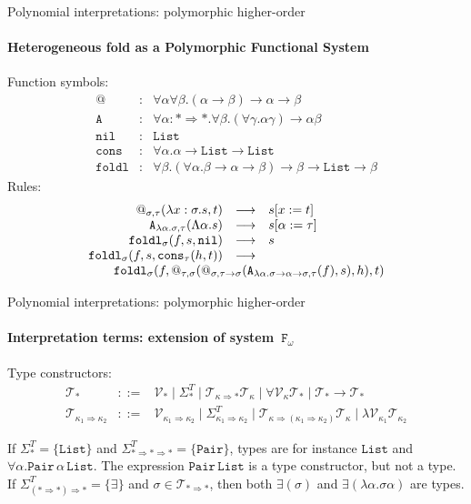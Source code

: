 \documentclass[10pt,presentation,color=names]{beamer}
\newcommand{\Fomega}{\mathtt{F}_\omega}
\newcommand{\arrkind}{\Rightarrow}
\newcommand{\arrtype}{\rightarrow}
\newcommand{\abs}[2]{\lambda #1.#2}
\newcommand{\tabs}[2]{\Lambda #1.#2}
\newcommand{\red}{\longrightarrow}
\newcommand{\Tc}{\mathcal{T}}
\newcommand{\Vc}{\mathcal{V}}
\newcommand{\List}{\mathtt{List}}
\newcommand{\Pair}{\mathtt{Pair}}
\newcommand{\nil}{\mathtt{nil}}
\newcommand{\cons}{\mathtt{cons}}
\begin{document}
\begin{frame}{Polynomial interpretations: polymorphic higher-order}
  \framesubtitle{Heterogeneous fold as a Polymorphic Functional System}
  Function symbols:
  \[
  \begin{array}{rcl}
    @ & : & \forall \alpha \forall \beta . (\alpha \arrtype \beta) \arrtype \alpha \arrtype \beta \\
    \mathtt{A} & : & \forall \alpha : * \arrkind * . \forall \beta .
    (\forall \gamma .\alpha \gamma) \arrtype \alpha \beta \\
    \mathtt{nil} & : & \List \\
    \mathtt{cons} & : & \forall \alpha . \alpha \arrtype \List \arrtype \List \\
    \mathtt{foldl} & : & \forall \beta . (\forall \alpha . \beta \arrtype \alpha \arrtype \beta) \arrtype \beta \arrtype \List \arrtype \beta
  \end{array}
  \]\pause
  Rules:
  \[
  \begin{array}{rcl}
    @_{\sigma,\tau}(\abs{x:\sigma}{s},t) & \red & s[x:=t] \\
    \mathtt{A}_{\abs{\alpha}{\sigma},\tau}(\tabs{\alpha}{s}) & \red & s[\alpha:=\tau] \\
    \mathtt{foldl}_\sigma(f,s,\nil) & \red & s \\
    \mathtt{foldl}_\sigma(f,s,\cons_\tau(h,t)) & \red & \\
    \multicolumn{3}{c}{\quad\quad\mathtt{foldl}_\sigma(f,@_{\tau,\sigma}(@_{\sigma,\tau\arrtype\sigma}(\mathtt{A}_{\abs{\alpha}{\sigma\arrtype\alpha\arrtype\sigma},\tau}(f),s),h),t)}
  \end{array}
  \]
\end{frame}

\begin{frame}{Polynomial interpretations: polymorphic higher-order}
  \framesubtitle{Interpretation terms: extension of system~$\Fomega$}
  Type constructors:
  \[
  \begin{array}{rcl}
    \Tc_{*} &::=& \Vc_{*} \mid \Sigma^T_{*} \mid \Tc_{\kappa\arrkind
      *}\Tc_{\kappa} \mid \forall\Vc_\kappa\Tc_* \mid
    \Tc_*\arrtype\Tc_* \\ \Tc_{\kappa_1\arrkind\kappa_2} &::=&
    \Vc_{\kappa_1\arrkind\kappa_2} \mid
    \Sigma^T_{\kappa_1\arrkind\kappa_2} \mid
    \Tc_{\kappa\arrkind(\kappa_1\arrkind\kappa_2)}\Tc_{\kappa} \mid
    \lambda \Vc_{\kappa_1} \Tc_{\kappa_2}
  \end{array}
  \]
  \pause
  \begin{example}
  If $\Sigma^T_{*} = \{ \List \}$ and $\Sigma^T_{* \arrkind * \arrkind
    *} = \{ \Pair \}$, types are for instance $\List$ and $\forall
  \alpha.\Pair\,\alpha\,\List$.  The expression $\Pair\,\List$ is a
  type constructor, but not a type.  If $\Sigma^T_{(* \arrkind *)
    \arrkind *} = \{ \exists \}$ and $\sigma \in \Tc_{* \arrkind *}$,
  then both $\exists(\sigma)$ and $\exists (\lambda
  \alpha.\sigma\alpha)$ are types.
  \end{example}
\end{frame}
\end{document}
